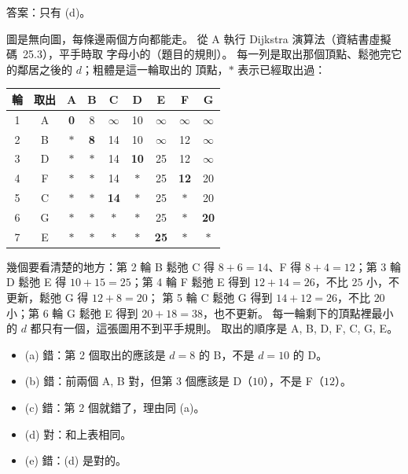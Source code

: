 \begin{pastsoln}
答案：只有 (d)。

圖是無向圖，每條邊兩個方向都能走。 從 A 執行 Dijkstra 演算法（資結書虛擬碼~25.3），平手時取
字母小的（題目的規則）。 每一列是取出那個頂點、鬆弛完它的鄰居之後的 $d$；粗體是這一輪取出的
頂點，$*$ 表示已經取出過：
\begin{center}
\small
\begin{tabular}{cc*{7}{c}}
\toprule
輪 & 取出 & A & B & C & D & E & F & G \\
\midrule
1 & A & \textbf{0} & 8 & $\infty$ & 10 & $\infty$ & $\infty$ & $\infty$ \\
2 & B & $*$ & \textbf{8} & 14 & 10 & $\infty$ & 12 & $\infty$ \\
3 & D & $*$ & $*$ & 14 & \textbf{10} & 25 & 12 & $\infty$ \\
4 & F & $*$ & $*$ & 14 & $*$ & 25 & \textbf{12} & 20 \\
5 & C & $*$ & $*$ & \textbf{14} & $*$ & 25 & $*$ & 20 \\
6 & G & $*$ & $*$ & $*$ & $*$ & 25 & $*$ & \textbf{20} \\
7 & E & $*$ & $*$ & $*$ & $*$ & \textbf{25} & $*$ & $*$ \\
\bottomrule
\end{tabular}
\end{center}
幾個要看清楚的地方：第 2 輪 B 鬆弛 C 得 $8 + 6 = 14$、F 得 $8 + 4 = 12$；第 3 輪 D 鬆弛 E 得
$10 + 15 = 25$；第 4 輪 F 鬆弛 E 得到 $12 + 14 = 26$，不比 $25$ 小，不更新，鬆弛 G 得 $12 + 8 = 20$；
第 5 輪 C 鬆弛 G 得到 $14 + 12 = 26$，不比 $20$ 小；第 6 輪 G 鬆弛 E 得到 $20 + 18 = 38$，也不更新。
每一輪剩下的頂點裡最小的 $d$ 都只有一個，這張圖用不到平手規則。 取出的順序是
A, B, D, F, C, G, E。
\begin{itemize}
\item (a) 錯：第 2 個取出的應該是 $d = 8$ 的 B，不是 $d = 10$ 的 D。
\item (b) 錯：前兩個 A, B 對，但第 3 個應該是 D（$10$），不是 F（$12$）。
\item (c) 錯：第 2 個就錯了，理由同 (a)。
\item (d) 對：和上表相同。
\item (e) 錯：(d) 是對的。
\end{itemize}
\end{pastsoln}
